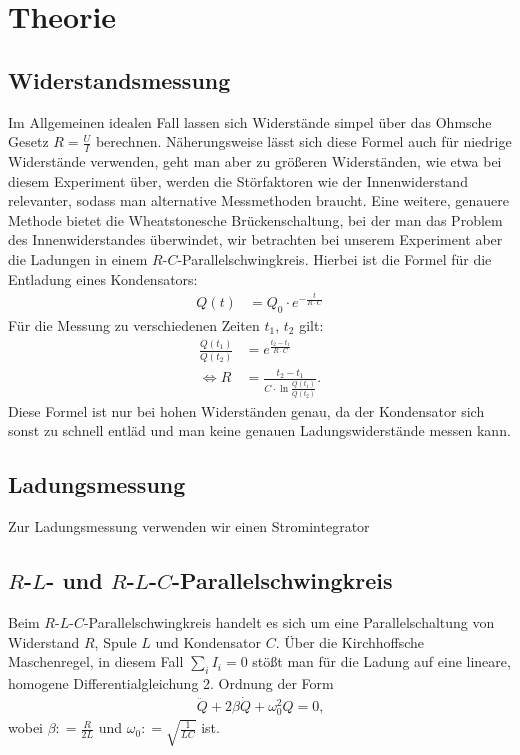 \section{Theorie}
\subsection{Widerstandsmessung}
Im Allgemeinen idealen Fall lassen sich Widerstände simpel über das Ohmsche Gesetz $ R = \frac{U}{I} $ berechnen. Näherungsweise lässt sich diese Formel auch für niedrige Widerstände verwenden, geht man aber zu größeren Widerständen, wie etwa bei diesem Experiment über, werden die Störfaktoren wie der Innenwiderstand relevanter, sodass man alternative Messmethoden braucht. Eine weitere, genauere Methode bietet die Wheatstonesche Brückenschaltung, bei der man das Problem des Innenwiderstandes überwindet, wir betrachten bei unserem Experiment aber die Ladungen in einem $ R $-$ C $-Parallelschwingkreis. Hierbei ist die Formel für die Entladung eines Kondensators:
\begin{align}
Q(t) & = Q_0 \cdot e^{- \frac{t}{R \cdot C}}
\end{align}
Für die Messung zu verschiedenen Zeiten $t_1$, $t_2$ gilt:
\begin{align}
\frac{Q(t_1)}{Q(t_2)} & = e^{\frac{t_2 - t_1}{R \cdot C}} \\
\Leftrightarrow R & = \frac{t_2 - t_1}{C \cdot \ln{ \frac{Q(t_1)}{Q(t_2)}}} \text{.}
\end{align}
Diese Formel ist nur bei hohen Widerständen genau, da der Kondensator sich sonst zu schnell entläd und man keine genauen Ladungswiderstände messen kann.
\subsection{Ladungsmessung}
Zur Ladungsmessung verwenden wir einen Stromintegrator
\subsection{$R$-$L$- und $R$-$L$-$C$-Parallelschwingkreis}
Beim $ R $-$ L $-$ C $-Parallelschwingkreis handelt es sich um eine Parallelschaltung von Widerstand $ R $, Spule $ L $ und Kondensator $ C $. Über die Kirchhoffsche Maschenregel, in diesem Fall $ \sum_i I_i = 0 $ stößt man für die Ladung auf eine lineare, homogene Differentialgleichung 2. Ordnung der Form
\begin{align}
\ddot{Q} + 2 \beta \dot{Q} + \omega_{0}^2 Q = 0 \text{,}
\end{align}
wobei $ \beta : = \frac{R}{2L} $ und $ \omega_{0} : = \sqrt{ \frac{1}{LC}} $ ist.

